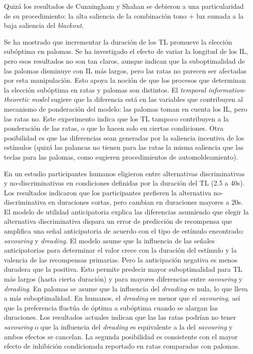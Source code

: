 \documentclass[a4paper,12pt]{article}
\begin{document}
Quizá los resultados de Cunningham y Shahan se debieron a una particularidad de su procedimiento: la alta saliencia de la combinación tono + luz sumada a la baja saliencia del {\itshape blackout}. 

Se ha mostrado que incrementar la duración de los TL promueve la elección subóptima en palomas. Se ha investigado el efecto de variar la longitud de los IL, pero esos resultados no son tan claros, aunque indican que la suboptimalidad de las palomas disminuye con IL más largos, pero las ratas no parecen ser afectadas por esta manipulación. Esto apoya la noción de que los procesos que determinan la elección subóptima en ratas y palomas son distintos. El {\itshape temporal information-theoretic model} sugiere que la diferencia está en las variables que contribuyen al mecanismo de ponderación del modelo: las palomas toman en cuenta los IL, pero las ratas no. Este experimento indica que los TL tampoco contribuyen a la ponderación de las ratas, o que lo hacen solo en ciertas condiciones. Otra posibilidad es que las diferencias sean generadas por la saliencia incentiva de los estímulos (quizá las palancas no tienen para las ratas la misma saliencia que las teclas para las palomas, como sugieren procedimientos de automoldeamiento). 

En un estudio participantes humanos eligieron entre alternativas discriminativas y no-discriminativas en condiciones definidas por la duración del TL (2.5 a 40s). Los resultados indicaron que los participantes prefieren la alternativa no-discriminativa en duraciones cortas, pero cambian en duraciones mayores a 20s. El modelo de utilidad anticipatoria explica las diferencias asumiendo que elegir la alternativa discriminativa dispara un error de predicción de recompensa que amplifica una señal anticipatoria de acuerdo con el tipo de estímulo encontrado: {\itshape savouring} y {\itshape dreading}. El modelo asume que la influencia de las señales anticipatorias para determinar el valor crece con la duración del estímulo y la valencia de las recompensas primarias. Pero la anticipación negativa es menos duradera que la positiva. Esto permite predecir mayor suboptimalidad para TL más largos (hasta cierta duración) y para mayores diferencias entre {\itshape savouring} y {\itshape dreading}. En palomas se asume que la influencia del {\itshape dreading} es nula, lo que lleva a más suboptimalidad. En humanos, el {\itshape dreading} es menor que el {\itshape savouring}, así que la preferencia fluctúa de óptima a subóptima cuando se alargan las duraciones. Los resultados actuales indican que las las ratas podrían no tener {\itshape savouring} o que la influencia del {\itshape dreading} es equivalente a la del {\itshape savouring} y ambos efectos se cancelan. La segunda posibilidad es consistente con el mayor efecto de inhibición condicionada reportado en ratas comparadas con palomas.
\end{document}
